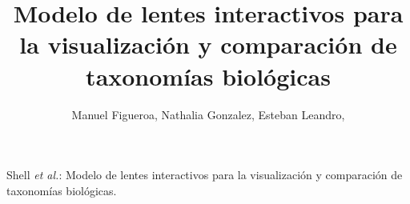 \documentclass[journal]{IEEEtran}
\begin{document}
%
\title{ Modelo de lentes interactivos para la visualización y comparación de taxonomías biológicas }
%
%
%

\author{Manuel Figueroa,
        Nathalia Gonzalez,
        Esteban Leandro,}%

% 
%



%
{Shell \MakeLowercase{\textit{et al.}}: Modelo de lentes interactivos para la visualización y comparación de taxonomías biológicas. }
% 
\end{document}
